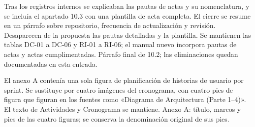 {Tras los registros internos se explicaban las pautas de actas y su nomenclatura, y se incluía el apartado 10.3 con una plantilla de acta completa.}
{El cierre se resume en un párrafo sobre repositorio, frecuencia de actualización y revisión. Desaparecen de la propuesta las pautas detalladas y la plantilla. Se mantienen las tablas DC-01 a DC-06 y RI-01 a RI-06; el manual nuevo incorpora pautas de actas y actas cumplimentadas.}
{Párrafo final de 10.2; las eliminaciones quedan documentadas en esta entrada.}

{El anexo A contenía una sola figura de planificación de historias de usuario por sprint.}
{Se sustituye por cuatro imágenes del cronograma, con cuatro pies de figura que figuran en los fuentes como «Diagrama de Arquitectura (Parte 1--4)». El texto de Actividades y Cronograma se mantiene.}
{Anexo A: título, marcos y pies de las cuatro figuras; se conserva la denominación original de sus pies.}
\endgroup
